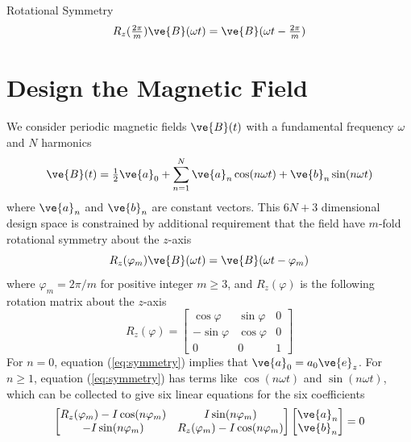 Rotational Symmetry
\begin{equation}
    R_z(\tfrac{2\pi}{m}) \ve{B}(\omega t) = \ve{B}(\omega t - \tfrac{2\pi}{m}) 
\end{equation}




 \section{Design the Magnetic Field}
 We consider periodic magnetic fields $\ve{B}(t)$ with a fundamental frequency $\omega$ and $N$ harmonics
\begin{equation}
    \ve{B}(t) = \tfrac{1}{2} \ve{a}_0 + \sum_{n=1}^N \ve{a}_n \cos(n\omega t) + \ve{b}_n \sin(n\omega t)
\end{equation}
where $\ve{a}_n$ and $\ve{b}_n$ are constant vectors. This $6N+3$ dimensional design space is constrained by additional requirement that the field have $m$-fold rotational symmetry about the $z$-axis
\begin{equation}
    R_z(\varphi_m) \ve{B}(\omega t) = \ve{B}(\omega t - \varphi_m) \label{eq:symmetry}
\end{equation}
where $\varphi_m=2\pi/m$ for positive integer $m\geq 3$, and $R_z(\varphi)$ is the following rotation matrix about the $z$-axis
\begin{equation}
    R_z(\varphi) = \begin{bmatrix} 
    \cos \varphi & \sin \varphi & 0 \\
    -\sin \varphi & \cos \varphi & 0 \\
    0 & 0 & 1    
    \end{bmatrix}
\end{equation}
For $n=0$, equation (\ref{eq:symmetry}) implies that $\ve{a}_0 = a_0 \ve{e}_z$. For $n\geq1$, equation (\ref{eq:symmetry}) has terms like $\cos(n \omega t)$ and $\sin(n\omega t)$, which can be collected to give six linear equations for the six coefficients 
\begin{equation}
    \begin{bmatrix} 
    R_z(\varphi_m) - I \cos(n\varphi_m) & I \sin(n \varphi_m) \\
    -I \sin(n \varphi_m) & R_z(\varphi_m) - I \cos(n\varphi_m)
    \end{bmatrix} 
    \begin{bmatrix} \ve{a}_n \\ \ve{b}_n \end{bmatrix} = 0
\end{equation}
